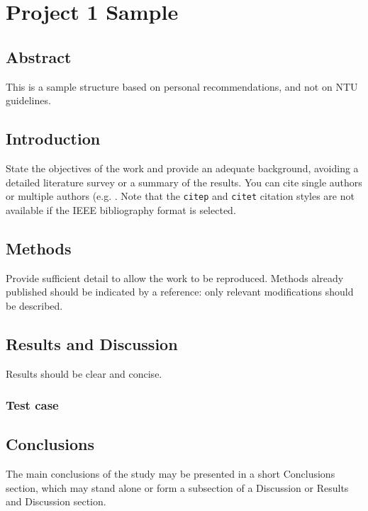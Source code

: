 \chapter[Project 1 Sample]{Project 1 Sample}\label{chap-sample}

\section{Abstract}

This is a sample structure based on personal recommendations, and not on \ac{NTU} guidelines.

\section{Introduction}\label{section-intro}
State the objectives of the work and provide an adequate background, avoiding a detailed literature survey or a summary of the results. You can cite single authors \cite{connor2006inversion} or multiple authors (e.g. \cite{volentik2010modeling, costa2012, bonadonna2013}.  Note that the \texttt{citep} and \texttt{citet} citation styles are not available if the IEEE bibliography format is selected.

\section{Methods}\label{section-methods}

Provide sufficient detail to allow the work to be reproduced. Methods already published should be indicated by a reference: only relevant modifications should be described. 

\section{Results and Discussion}\label{section-results} 
Results should be clear and concise. 

\subsection{Test case}

\section{Conclusions}\label{section-conclusion}

The main conclusions of the study may be presented in a short Conclusions section, which may stand alone or form a subsection of a Discussion or Results and Discussion section.

